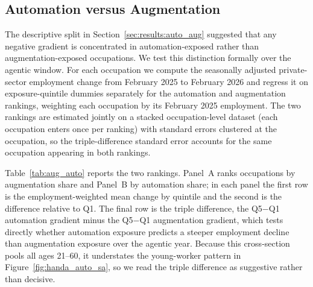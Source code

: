 \documentclass[12pt]{article}
\begin{document}

\subsection{Automation versus Augmentation}\label{sec:regression:autoaug}

The descriptive split in Section~\ref{sec:results:auto_aug} suggested that any negative gradient is concentrated in automation-exposed rather than augmentation-exposed occupations. We test this distinction formally over the agentic window. For each occupation we compute the seasonally adjusted private-sector employment change from February 2025 to February 2026 and regress it on exposure-quintile dummies separately for the \citet{handa2025} automation and augmentation rankings, weighting each occupation by its February 2025 employment. The two rankings are estimated jointly on a stacked occupation-level dataset (each occupation enters once per ranking) with standard errors clustered at the occupation, so the triple-difference standard error accounts for the same occupation appearing in both rankings.

Table~\ref{tab:aug_auto} reports the two rankings. Panel~A ranks occupations by augmentation share and Panel~B by automation share; in each panel the first row is the employment-weighted mean change by quintile and the second is the difference relative to Q1. The final row is the triple difference, the Q5$-$Q1 automation gradient minus the Q5$-$Q1 augmentation gradient, which tests directly whether automation exposure predicts a steeper employment decline than augmentation exposure over the agentic year. Because this cross-section pools all ages 21--60, it understates the young-worker pattern in Figure~\ref{fig:handa_auto_sa}, so we read the triple difference as suggestive rather than decisive.
\end{document}
